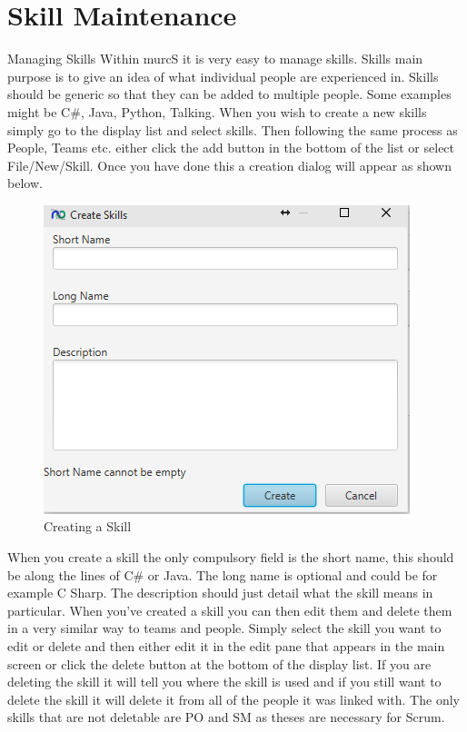 \section{Skill Maintenance}

Managing Skills
\newline\newline
Within murcS it is very easy to manage skills. Skills main purpose is to give an idea of what individual people are experienced in. Skills should be generic so that they can be added to multiple people. Some examples might be C\#, Java, Python, Talking.
\newline
When you wish to create a new skills simply go to the display list and select skills. Then following the same process as People, Teams etc. either click the add button in the bottom of the list or select File/New/Skill. Once you have done this a creation dialog will appear as shown below.

\begin{figure}[H]
\centering
\includegraphics[width=\textwidth]{images/screenshots/skills1.PNG}
\caption{Creating a Skill}
\label{fig:new_project}
\end{figure}

When you create a skill the only compulsory field is the short name, this should be along the lines of C\# or Java. The long name is optional and could be for example C Sharp. The description should just detail what the skill means in particular.
\newline\newline
When you've created a skill you can then edit them and delete them in a very similar way to teams and people. Simply select the skill you want to edit or delete and then either edit it in the edit pane that appears in the main screen or click the delete button at the bottom of the display list. If you are deleting the skill it will tell you where the skill is used and if you still want to delete the skill it will delete it from all of the people it was linked with. The only skills that are not deletable are PO and SM as theses are necessary for Scrum.